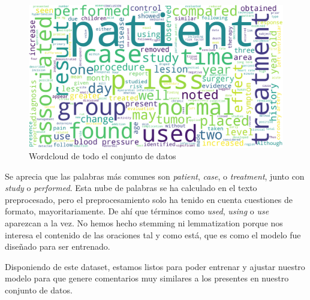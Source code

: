 \begin{figure}[h]
	\centering
	\includegraphics[width=.9\textwidth]{media/wordcloud_full_data.png}
	\caption{Wordcloud de todo el conjunto de datos}
	\label{fig:wordcloud}
\end{figure}

Se aprecia que las palabras más comunes son \textit{patient}, \textit{case}, o \textit{treatment}, junto con \textit{study} o \textit{performed}. Esta nube de palabras se ha calculado en el texto preprocesado, pero el preprocesamiento solo ha tenido en cuenta cuestiones de formato, mayoritariamente. De ahí que términos como \textit{used}, \textit{using} o \textit{use} aparezcan a la vez. No hemos hecho stemming ni lemmatization porque nos interesa el contenido de las oraciones tal y como está, que es como el modelo fue diseñado para ser entrenado.

Disponiendo de este dataset, estamos listos para poder entrenar y ajustar nuestro modelo para que genere comentarios muy similares a los presentes en nuestro conjunto de datos.
